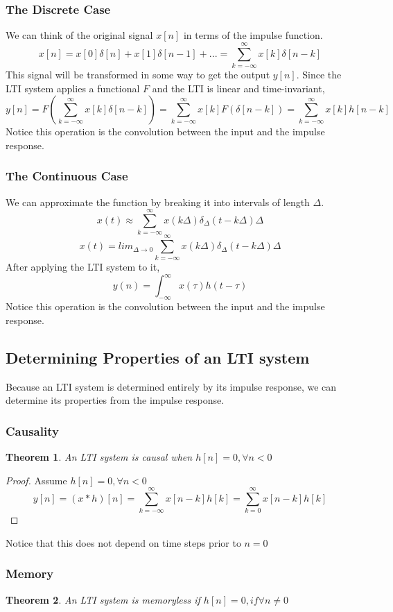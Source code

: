 \documentclass{article}
\newtheorem{theorem}{Theorem}
\newtheorem{proof}{Proof}
\begin{document}
\subsubsection{The Discrete Case}
We can think of the original signal $x[n]$ in terms of the impulse function.
$$x[n] = x[0]\delta[n]+x[1]\delta[n-1]+... = \sum_{k=-\infty}^{\infty}{x[k]\delta[n-k]}$$
This signal will be transformed in some way to get the output $y[n]$.
Since the LTI system applies a functional $F$ and the LTI is linear and time-invariant,
$$y[n] = F(\sum_{k=-\infty}^{\infty}{x[k]\delta[n-k]}) = \sum_{k=-\infty}^{\infty}{x[k]F(\delta[n-k])} = \sum_{k=-\infty}^{\infty}{x[k]h[n-k]}$$
Notice this operation is the convolution between the input and the impulse response.
\subsubsection{The Continuous Case}
We can approximate the function by breaking it into intervals of length $\Delta$.
$$x(t) \approx \sum_{k=-\infty}^{\infty}{x(k\Delta)\delta_{\Delta}(t-k\Delta)\Delta}$$
$$x(t) = lim_{\Delta \rightarrow 0}\sum_{k=-\infty}^{\infty}{x(k\Delta)\delta_{\Delta}(t-k\Delta)\Delta}$$
After applying the LTI system to it,
$$y(n) = \int_{-\infty}^{\infty}{x(\tau)h(t-\tau)}$$
Notice this operation is the convolution between the input and the impulse response.
\subsection{Determining Properties of an LTI system}
Because an LTI system is determined entirely by its impulse response, we can determine its properties from the impulse response.
\subsubsection{Causality}
\begin{theorem}
    An LTI system is causal when $h[n] = 0, \forall n < 0$
\end{theorem}
\begin{proof}
Assume $h[n] = 0, \forall n < 0$
$$y[n] = (x*h)[n] = \sum_{k=-\infty}^{\infty}{x[n-k]h[k]}=\sum_{k=0}^{\infty}{x[n-k]h[k]}$$
\end{proof}
Notice that this does not depend on time steps prior to $n=0$
\subsubsection{Memory}
\begin{theorem}
    An LTI system is memoryless if $h[n]=0, if \forall n \ne 0$
\end{theorem}
\end{document}
